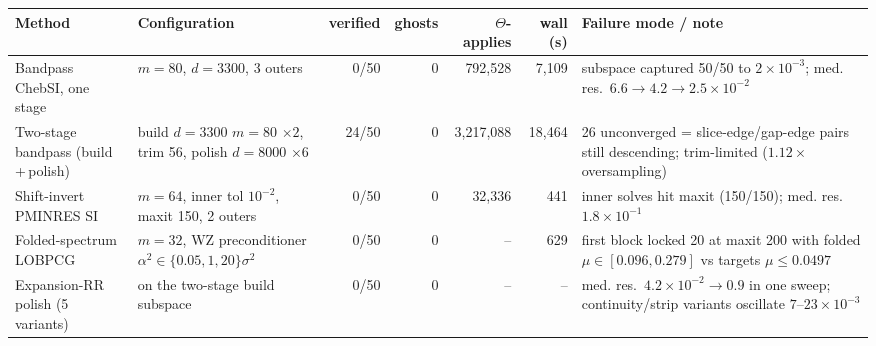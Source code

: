 \begin{tabular}{@{}p{2.5cm}p{3.4cm}rrrrp{4.2cm}@{}}
\hline\hline
Method & Configuration & verified & ghosts & $\Theta$-applies & wall (s) & Failure mode / note \\
\hline
Bandpass ChebSI, one stage & $m=80$, $d=3300$, 3 outers & 0/50 & 0 & 792,528 & 7,109 & subspace captured 50/50 to $2\times10^{-3}$; med. res.\ $6.6\to4.2\to2.5\times10^{-2}$ \\
Two-stage bandpass (build\,+\,polish) & build $d=3300$ $m=80$ $\times2$, trim 56, polish $d=8000$ $\times6$ & 24/50 & 0 & 3,217,088 & 18,464 & 26 unconverged = slice-edge/gap-edge pairs still descending; trim-limited ($1.12\times$ oversampling) \\
Shift-invert PMINRES SI & $m=64$, inner tol $10^{-2}$, maxit 150, 2 outers & 0/50 & 0 & 32,336 & 441 & inner solves hit maxit (150/150); med. res.\ $1.8\times10^{-1}$ \\
Folded-spectrum LOBPCG & $m=32$, WZ preconditioner $\alpha^2\in\{0.05,1,20\}\sigma^2$ & 0/50 & 0 & -- & 629 & first block locked 20 at maxit 200 with folded $\mu\in[0.096,0.279]$ vs targets $\mu\le0.0497$ \\
Expansion-RR polish (5 variants) & on the two-stage build subspace & 0/50 & 0 & -- & -- & med. res.\ $4.2\times10^{-2}\to0.9$ in one sweep; continuity/strip variants oscillate $7$--$23\times10^{-3}$ \\
\hline\hline
\end{tabular}
